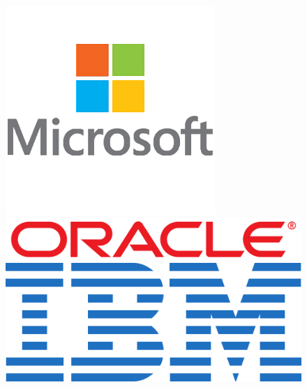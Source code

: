 \documentclass[xcolor=dvipsnames]{beamer}
\begin{document}
\begin{frame}
\begin{figure}
\begin{center}
	\hspace{0.15cm}\includegraphics[scale=0.20]{microsoft.png} \\[0.3cm]
	\hspace{0.15cm}\includegraphics[scale=0.20]{oracle.png}
	\hspace{0.15cm}\includegraphics[scale=0.15]{ibm.png}\\[0.3cm]

\end{center}
\end{figure}
\end{frame}
\end{document}
